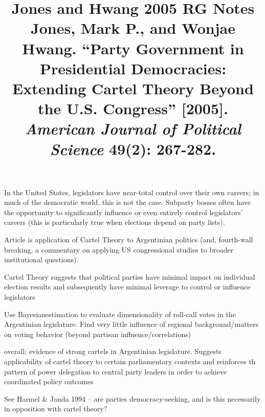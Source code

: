 \documentclass[12pt]{article}
\title{\textbf{Jones and Hwang 2005 RG Notes}\\
\large Jones, Mark P., and Wonjae Hwang. ``Party Government in Presidential Democracies: Extending Cartel Theory Beyond the U.S. Congress'' [2005].\\
\textit{American Journal of Political Science} 49(2): 267-282.}
\author{}
\date{}
\begin{document}
\maketitle

In the United States, legislators have near-total control over their own careers; in much of the democratic world, this is not the case. Subparty bosses often have the opportunity to significantly influence or even entirely control legislators' careers (this is particularly true when elections depend on party lists).

Article is application of Cartel Theory to Argentinian politics (and, fourth-wall breaking, a commentary on applying US congressional studies to broader institutional questions).

Cartel Theory suggests that political parties have minimal impact on individual election results and subsequently have minimal leverage to control or influence legislators

Use Bayesianestimation to evaluate dimensionality of roll-call votes in the Argentinian legislature. Find very little influence of regional background/matters on voting behavior (beyond partisan influence/correlations)

overall: evidence of strong cartels in Argentinian legislature. Suggests applicability of cartel theory to certain parliamentary contexts and reinforces th pattern of power delegation to central party leaders in order to achieve coordinated policy outcomes

See Harmel \& Janda 1994 -- are parties democracy-seeking, and is this necessarily in opposition with cartel theory?
\end{document}
